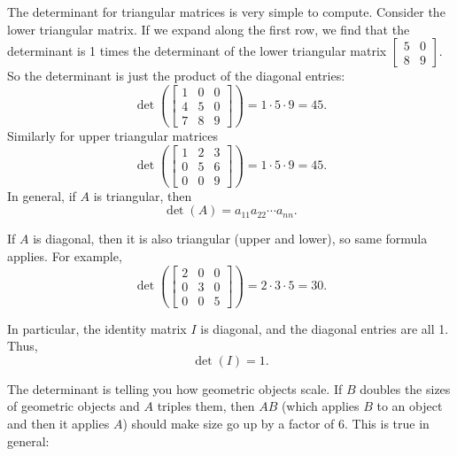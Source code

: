 The determinant for triangular matrices is very simple to compute.  
Consider the lower triangular matrix.  If we expand along the
first row, we find that the determinant is 1 times the determinant
of the lower triangular matrix $\left[ \begin{smallmatrix} 5 & 0 \\ 8 & 9
\end{smallmatrix} \right]$.  So the determinant is just the
product of the diagonal entries:
\begin{equation*}
\det \left(
\begin{bmatrix}
1 & 0 & 0 \\
4 & 5 & 0 \\
7 & 8 & 9
\end{bmatrix} 
\right)
=
1 \cdot 5 \cdot 9 = 45 .
\end{equation*}
Similarly for upper triangular matrices
\begin{equation*}
\det \left(
\begin{bmatrix}
1 & 2 & 3 \\
0 & 5 & 6 \\
0 & 0 & 9
\end{bmatrix}
\right)
=
1 \cdot 5 \cdot 9 = 45 .
\end{equation*}
In general, if $A$ is triangular, then
\begin{equation*}
\det (A) = a_{11} a_{22} \cdots a_{nn} .
\end{equation*}

If $A$ is diagonal, then it is also triangular (upper and lower), so
same formula applies.  For example,
\begin{equation*}
\det \left(
\begin{bmatrix}
2 & 0 & 0 \\
0 & 3 & 0 \\
0 & 0 & 5
\end{bmatrix}
\right)
=
2 \cdot 3 \cdot 5 = 30 .
\end{equation*}

In particular, the identity matrix $I$ is diagonal, and the diagonal entries
are all 1.  Thus,
\begin{equation*}
\det(I) = 1 .
\end{equation*}

\medskip

The determinant is telling you how geometric objects scale.
If $B$ doubles the sizes of geometric objects and $A$ triples them,
then $AB$ (which applies $B$ to an object and then it applies $A$) should make size
go up by a factor of $6$.  This is true in general:

